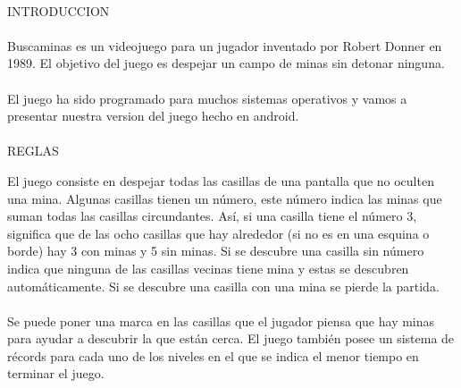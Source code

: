 \documentclass[../documentacion_buscaminas2013.tex]{subfiles}
\begin{document}
\paragraph{ } INTRODUCCION

\paragraph{ }
Buscaminas es un videojuego para un jugador inventado por Robert Donner en 1989. El objetivo del juego es despejar un campo de minas sin detonar ninguna.
\paragraph{ }
El juego ha sido programado para muchos sistemas operativos y vamos a presentar nuestra version del juego hecho en android.
\paragraph{ }
REGLAS

El juego consiste en despejar todas las casillas de una pantalla que no oculten una mina. Algunas casillas tienen un número, este número indica las minas que suman todas las casillas circundantes. Así, si una casilla tiene el número 3, significa que de las ocho casillas que hay alrededor (si no es en una esquina o borde) hay 3 con minas y 5 sin minas. Si se descubre una casilla sin número indica que ninguna de las casillas vecinas tiene mina y estas se descubren automáticamente. Si se descubre una casilla con una mina se pierde la partida.

\paragraph{ }
Se puede poner una marca en las casillas que el jugador piensa que hay minas para ayudar a descubrir la que están cerca. El juego también posee un sistema de récords para cada uno de los niveles en el que se indica el menor tiempo en terminar el juego.

\clearpage
\end{document}
